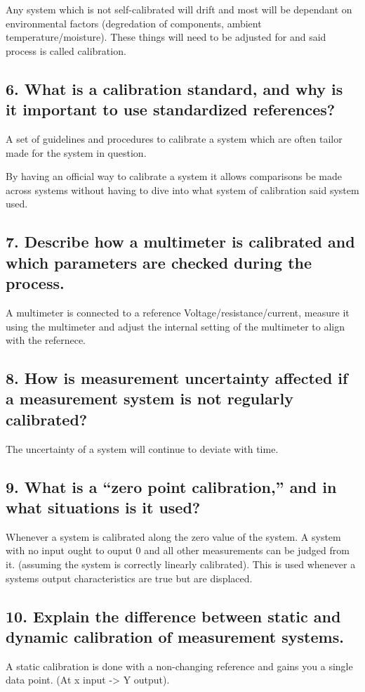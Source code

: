 Any system which is not self-calibrated will drift and most will be dependant on environmental factors (degredation of components, ambient temperature/moisture). These things will need to be adjusted for and said process is called calibration.


\subsection{\textbf{6. What is a calibration standard, and why is it important to use standardized references?}}
A set of guidelines and procedures to calibrate a system which are often tailor made for the system in question. 

By having an official way to calibrate a system it allows comparisons be made across systems without having to dive into what system of calibration said system used.

\subsection{\textbf{7. Describe how a multimeter is calibrated and which parameters are checked during the process.}}
A multimeter is connected to a reference Voltage/resistance/current, measure it using the multimeter and adjust the internal setting of the multimeter to align with the refernece.

\subsection{\textbf{8. How is measurement uncertainty affected if a measurement system is not regularly calibrated?}}
The uncertainty of a system will continue to deviate with time.

\subsection{\textbf{9. What is a “zero point calibration,” and in what situations is it used?}}
Whenever a system is calibrated along the zero value of the system. A system with no input ought to ouput 0 and all other measurements can be judged from it. (assuming the system is correctly linearly calibrated).
This is used whenever a systems output characteristics are true but are displaced.

\subsection{\textbf{10. Explain the difference between static and dynamic calibration of measurement systems.}}
A static calibration is done with a non-changing reference and gains you a single data point. (At x input -> Y output).

